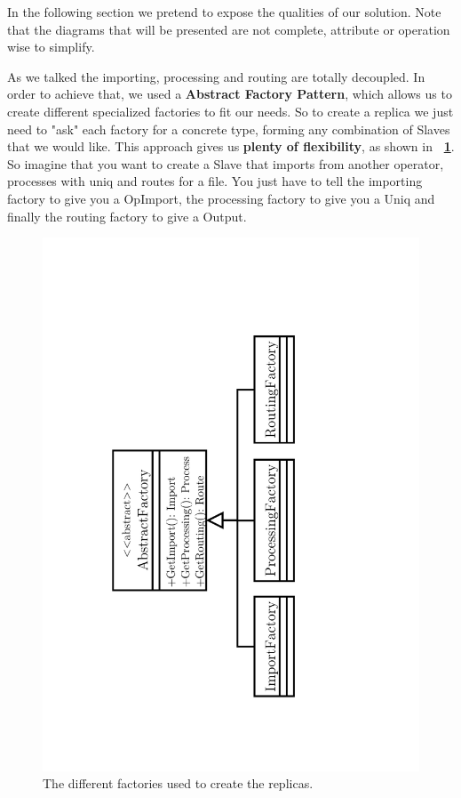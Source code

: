 \documentclass[times, 10pt,twocolumn]{article}
\begin{document}

In the following section we pretend to expose the qualities of our solution. Note that the diagrams that will be presented are not complete, attribute or operation wise to simplify.

As we talked the importing, processing and routing are totally decoupled. In order to achieve that, we used a \textbf{Abstract Factory Pattern}, which allows us to create different specialized factories to fit our needs. So to create a replica we just need to "ask" each factory for a concrete type, forming any combination of Slaves that we would like. This approach gives us \textbf{plenty of flexibility}, as shown in \textbf{~\cref{fig:factories}}. So imagine that you want to create a Slave that imports from another operator, processes with uniq and routes for a file. You just have to tell the importing factory to give you a OpImport, the processing factory to give you a Uniq and finally the routing factory to give a Output.

\begin{figure}[h]
\centering
	\includegraphics[scale=0.35]{"Architecture/Factories"}
    \caption{The different factories used to create the replicas. } 
    \label{fig:factories}
\end{figure}
\end{document}
